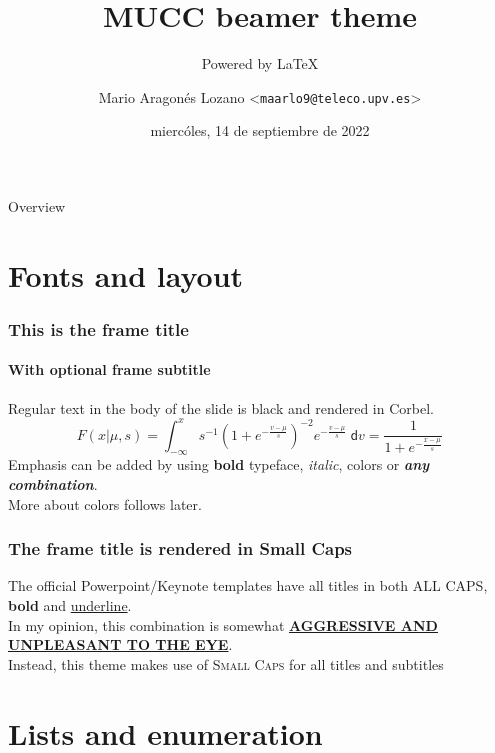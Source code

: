 \documentclass[aspectratio=169]{beamer}
\title{MUCC beamer theme}
\subtitle{Powered by \LaTeX}
\date{miercóles, 14 de septiembre de 2022}
\author[maarlo9]{Mario Aragonés Lozano <\texttt{maarlo9@teleco.upv.es}>}
\begin{document}
\titleframe

\begin{frame}{Overview}
    \tableofcontents[hideallsubsections]
\end{frame}

\section{Fonts and layout}

\begin{frame}
    \frametitle{This is the frame title}
    \framesubtitle{With optional frame subtitle}
    Regular text in the body of the slide is black and rendered in Corbel.\\[.5cm]
    \begin{equation*}
        F(x|\mu,s) = \int_{-\infty}^x s^{-1}\left(1+e^{-\frac{v-\mu}{s}}\right)^{-2} e^{-\frac{v-\mu}{s}}\;\mathsf{d}v = \frac{1}{1+e^{-\frac{x-\mu}{s}}}
    \end{equation*}
    Emphasis can be added by using \textbf{bold} typeface, \textit{italic}, {\color{mucc-alert}colors} or {\color{mucc-alert}\textbf{\textit{any combination}}}.\\
    More about colors follows later.
\end{frame}

\begin{frame}
    \frametitle{The frame title is rendered in Small Caps}
    The official Powerpoint/Keynote templates have all titles in both ALL CAPS, \textbf{bold} and \underline{underline}.\\[.5cm]
    In my opinion, this combination is somewhat \underline{\textbf{AGGRESSIVE AND UNPLEASANT TO THE EYE}}.\\[.5cm]
    Instead, this theme makes use of \textsc{Small Caps} for all titles and subtitles
\end{frame}


\section{Lists and enumeration}
\end{document}
